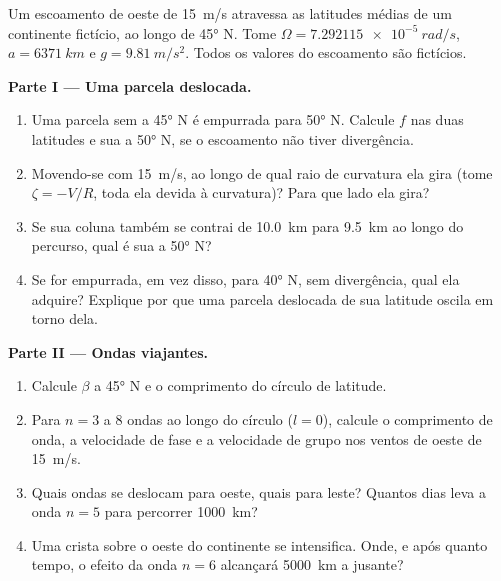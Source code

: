 \begin{problem}
\label{pb:b3:atmospheric-dynamics:1}
Um escoamento de oeste de \qty{15}{m/s} atravessa as latitudes médias de um
continente fictício, ao longo de \ang{45} N. Tome $\Omega =
\qty{7.292115e-5}{rad/s}$, $a = \qty{6371}{km}$ e $g = \qty{9.81}{m/s^2}$.
Todos os valores do escoamento são fictícios.

\medskip\noindent\textbf{Parte I --- Uma parcela deslocada.}
\begin{enumerate}
\item Uma parcela sem  a \ang{45} N é empurrada para
  \ang{50} N. Calcule $f$ nas duas latitudes e sua  a
  \ang{50} N, se o escoamento não tiver divergência.
\item Movendo-se com \qty{15}{m/s}, ao longo de qual raio de curvatura ela gira
  (tome $\zeta = -V/R$, toda ela devida à curvatura)? Para que lado ela gira?
\item Se sua coluna também se contrai de \qty{10.0}{km} para \qty{9.5}{km} ao longo do
  percurso, qual é sua  a \ang{50} N?
\item Se for empurrada, em vez disso, para \ang{40} N, sem divergência, qual
   ela adquire? Explique por que uma parcela deslocada de sua
  latitude oscila em torno dela.
\end{enumerate}

\medskip\noindent\textbf{Parte II --- Ondas viajantes.}
\begin{enumerate}[resume]
\item Calcule $\beta$ a \ang{45} N e o comprimento do círculo de latitude.
\item Para $n = 3$ a 8 ondas ao longo do círculo ($l = 0$), calcule o
  comprimento de onda, a velocidade de fase e a velocidade de grupo nos ventos de oeste de
  \qty{15}{m/s}.
\item Quais ondas se deslocam para oeste, quais para leste? Quantos dias leva a onda
  $n = 5$ para percorrer \qty{1000}{km}?
\item Uma crista sobre o oeste do continente se intensifica. Onde, e após quanto
  tempo, o efeito da onda $n = 6$ alcançará \qty{5000}{km}
  a jusante?
\end{enumerate}


\end{problem}
